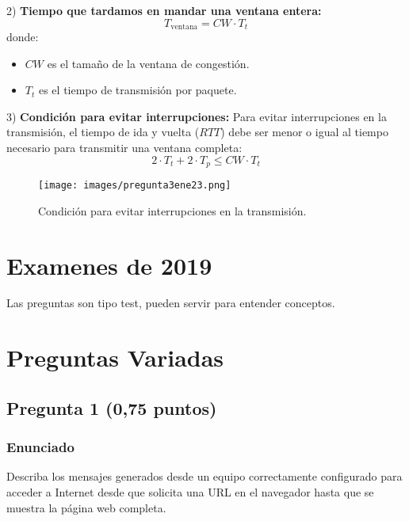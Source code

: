 \documentclass[12pt]{article}
\begin{document}
2) \textbf{Tiempo que tardamos en mandar una ventana entera:}  
\[ T_{\text{ventana}} = CW \cdot T_t \]  
donde:  
\begin{itemize}
    \item \( CW \) es el tamaño de la ventana de congestión.
    \item \( T_t \) es el tiempo de transmisión por paquete.
\end{itemize}

3) \textbf{Condición para evitar interrupciones:}  
Para evitar interrupciones en la transmisión, el tiempo de ida y vuelta (\( RTT \)) debe ser menor o igual al tiempo necesario para transmitir una ventana completa:  
\[ 2 \cdot T_t + 2 \cdot T_p \leq CW \cdot T_t \]

\begin{figure}[H]
    \centering
    \texttt{[image: images/pregunta3ene23.png]}
    \caption{Condición para evitar interrupciones en la transmisión.}
\end{figure}








\section{Examenes de 2019}

Las preguntas son tipo test, pueden servir para entender conceptos.





\section{Preguntas Variadas}

\subsection{Pregunta 1 (0,75 puntos)}
\subsubsection{Enunciado}
Describa los mensajes generados desde un equipo correctamente configurado para acceder a Internet desde que solicita una URL en el navegador hasta que se muestra la página web completa.
\end{document}

